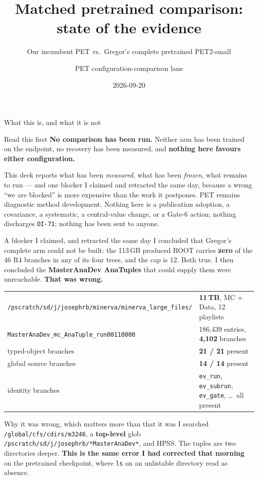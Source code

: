 \documentclass[aspectratio=169,10pt]{beamer}
\title{Matched pretrained comparison: state of the evidence}
\subtitle{Our incumbent PET vs.\ Gregor's complete pretrained PET2-small}
\author{PET configuration-comparison lane}
\date{2026-09-20}
\begin{document}
\frame{\titlepage}

\begin{frame}{What this is, and what it is not}
\begin{block}{Read this first}
\textbf{No comparison has been run.} Neither arm has been trained on the endpoint,
no recovery has been measured, and \textbf{nothing here favours either
configuration.}
\end{block}
This deck reports what has been \emph{measured}, what has been \emph{frozen}, what
remains to run --- and one blocker I claimed and retracted the same day, because a
wrong ``we are blocked'' is more expensive than the work it postpones.
\vfill
PET remains diagnostic method development. Nothing here is a publication adoption,
a covariance, a systematic, a central-value change, or a Gate-6 action; nothing
discharges \texttt{OI-71}; nothing has been sent to anyone.
\end{frame}

\begin{frame}{A blocker I claimed, and retracted the same day}
I concluded that Gregor's complete arm could not be built: the 113\,GB produced
ROOT carries \textbf{zero} of the 46 R4 branches in any of its four trees, and the
cap is 12. Both true. I then concluded the \textbf{MasterAnaDev AnaTuples} that
could supply them were unreachable. \textbf{That was wrong.}
\begin{center}\small
\begin{tabular}{ll}
\toprule
\texttt{/pscratch/sd/j/josephrb/minerva/minerva\_large\_files/} & \textbf{11\,TB}, MC + Data, 12 playlists \\
\texttt{MasterAnaDev\_mc\_AnaTuple\_run00110000} & 186{,}439 entries, \textbf{4{,}102} branches \\
typed-object branches & \textbf{21 / 21} present \\
global source branches & \textbf{14 / 14} present \\
identity branches & \texttt{ev\_run}, \texttt{ev\_subrun}, \texttt{ev\_gate}, \ldots\ all present \\
\bottomrule
\end{tabular}
\end{center}
\begin{block}{Why it was wrong, which matters more than that it was}
I searched \texttt{/global/cfs/cdirs/m3246}, a \textbf{top-level} glob
\texttt{/pscratch/sd/j/josephrb/*MasterAnaDev*}, and HPSS. The tuples are two
directories deeper. \textbf{This is the same error I had corrected that morning}
on the pretrained checkpoint, where \texttt{ls} on an unlistable directory read as
absence.
\end{block}
\end{frame}
\end{document}
